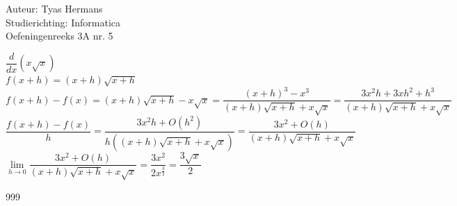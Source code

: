 \documentclass[a4paper]{article}
\begin{document}
  
\noindent \large Auteur: Tyas Hermans \\
\noindent \large Studierichting: Informatica\\
\noindent \large Oefeningenreeks 3A nr. 5\\

\medskip

\normalsize

$\dfrac{d}{dx}(x\sqrt{x})$\\

$f(x+h) = (x+h)\sqrt{x+h}$\\

$f(x+h) - f(x) = (x+h)\sqrt{x+h} - x\sqrt{x} = \dfrac{(x+h)^3-x^3}{(x+h)\sqrt{x+h}+x\sqrt{x}} = \dfrac{3x^2h+3xh^2+h^3}{(x+h)\sqrt{x+h}+x\sqrt{x}}$\\

$\dfrac{f(x+h) - f(x)}{h} = \dfrac{3x^2h+O(h^2)}{h((x+h)\sqrt{x+h}+x\sqrt{x})} = \dfrac{3x^2+O(h)}{(x+h)\sqrt{x+h}+x\sqrt{x}}$\\

$\lim\limits_{h\rightarrow 0} \dfrac{3x^2+O(h)}{(x+h)\sqrt{x+h}+x\sqrt{x}} = \dfrac{3x^2}{2x^{\frac{3}{2}}}  = \dfrac{3\sqrt{x}}{2}$\\

\begin{thebibliography}{999}
\end{thebibliography}
\end{document}
